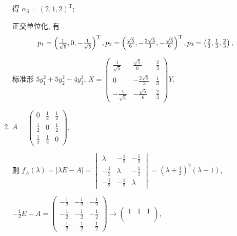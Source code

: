 \begin{enumerate}
			       得 \( \alpha_{3} = (2, 1, 2)^{\mathrm{T}} \);

			       正交单位化, 有 \[ p_{1} = \left(\frac{1}{\sqrt{5}}, 0, -\frac{1}{\sqrt{5}}\right)^{\mathrm{T}},
				       \newline  p_{2} = \left(\frac{\sqrt{5}}{6}, -\frac{2\sqrt{5}}{3}, -\frac{\sqrt{5}}{6}\right)^{\mathrm{T}}, \newline p_{3} = \left(\frac{2}{3}, \frac{1}{3}, \frac{2}{3}\right), \]

			       标准形 \( 5y_{1}^{2} + 5y_{2}^{2} - 4y_{3}^{2} \), \( X = \begin{pmatrix}
				       \frac{1}{\sqrt{5}}  & \frac{\sqrt{5}}{6}   & \frac{2}{3} \\
				       0                   & -\frac{2\sqrt{5}}{3} & \frac{1}{3} \\
				       -\frac{1}{\sqrt{5}} & -\frac{\sqrt{5}}{6}  & \frac{2}{3}
			       \end{pmatrix}Y \).
			 \item %
			       \( A = \begin{pmatrix}
				       0           & \frac{1}{2} & \frac{1}{2} \\
				       \frac{1}{2} & 0           & \frac{1}{2} \\
				       \frac{1}{2} & \frac{1}{2} & 0
			       \end{pmatrix} \),

			       则 \( f_{A}(\lambda) = |\lambda E - A| = \begin{vmatrix}
				       \lambda      & -\frac{1}{2} & -\frac{1}{2} \\
				       -\frac{1}{2} & \lambda      & -\frac{1}{2} \\
				       -\frac{1}{2} & -\frac{1}{2} & \lambda
			       \end{vmatrix} = (\lambda + \frac{1}{2})^{2}(\lambda - 1) \),

			       \( -\frac{1}{2}E - A = \begin{pmatrix}
				       -\frac{1}{2} & -\frac{1}{2} & -\frac{1}{2} \\
				       -\frac{1}{2} & -\frac{1}{2} & -\frac{1}{2} \\
				       -\frac{1}{2} & -\frac{1}{2} & -\frac{1}{2}
			       \end{pmatrix} \rightarrow \begin{pmatrix}
				       1 & 1 & 1 \\
				         &   &   \\
				         &   &
			       \end{pmatrix}\),


\end{enumerate}
